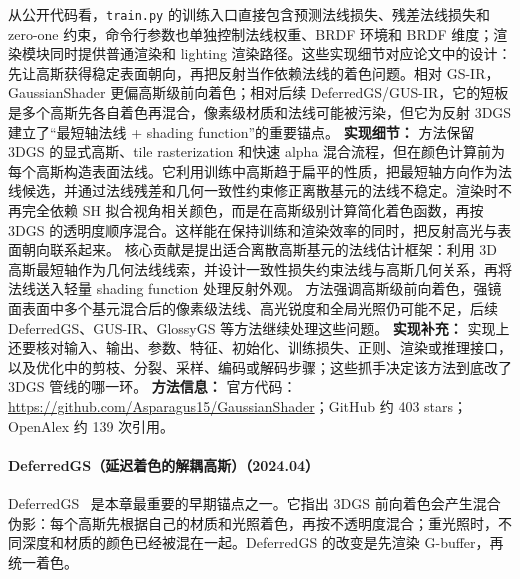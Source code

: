 从公开代码看，\texttt{train.py} 的训练入口直接包含预测法线损失、残差法线损失和 zero-one 约束，命令行参数也单独控制法线权重、BRDF 环境和 BRDF 维度；渲染模块同时提供普通渲染和 lighting 渲染路径。这些实现细节对应论文中的设计：先让高斯获得稳定表面朝向，再把反射当作依赖法线的着色问题。相对 GS-IR，GaussianShader 更偏高斯级前向着色；相对后续 DeferredGS/GUS-IR，它的短板是多个高斯先各自着色再混合，像素级材质和法线可能被污染，但它为反射 3DGS 建立了“最短轴法线 + shading function”的重要锚点。
\textbf{实现细节：} 方法保留 3DGS 的显式高斯、tile rasterization 和快速 alpha 混合流程，但在颜色计算前为每个高斯构造表面法线。它利用训练中高斯趋于扁平的性质，把最短轴方向作为法线候选，并通过法线残差和几何一致性约束修正离散基元的法线不稳定。渲染时不再完全依赖 SH 拟合视角相关颜色，而是在高斯级别计算简化着色函数，再按 3DGS 的透明度顺序混合。这样能在保持训练和渲染效率的同时，把反射高光与表面朝向联系起来。 核心贡献是提出适合离散高斯基元的法线估计框架：利用 3D 高斯最短轴作为几何法线线索，并设计一致性损失约束法线与高斯几何关系，再将法线送入轻量 shading function 处理反射外观。 方法强调高斯级前向着色，强镜面表面中多个基元混合后的像素级法线、高光锐度和全局光照仍可能不足，后续 DeferredGS、GUS-IR、GlossyGS 等方法继续处理这些问题。
\textbf{实现补充：} 实现上还要核对输入、输出、参数、特征、初始化、训练损失、正则、渲染或推理接口，以及优化中的剪枝、分裂、采样、编码或解码步骤；这些抓手决定该方法到底改了 3DGS 管线的哪一环。
\textbf{方法信息：} 官方代码：\url{https://github.com/Asparagus15/GaussianShader}；GitHub 约 403 stars；OpenAlex 约 139 次引用。



\paragraph{DeferredGS（延迟着色的解耦高斯）（2024.04）}
DeferredGS~\cite{2404_09412} 是本章最重要的早期锚点之一。它指出 3DGS 前向着色会产生混合伪影：每个高斯先根据自己的材质和光照着色，再按不透明度混合；重光照时，不同深度和材质的颜色已经被混在一起。DeferredGS 的改变是先渲染 G-buffer，再统一着色。


